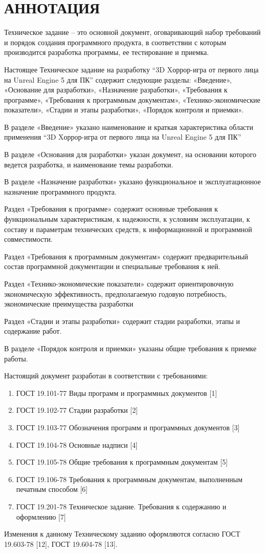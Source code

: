 \section*{АННОТАЦИЯ}

Техническое задание – это основной документ, оговаривающий набор требований и
порядок создания программного продукта, в соответствии с которым производится разработка программы, ее тестирование и приемка.

Настоящее Техническое задание на разработку ``3D Xоррор-игра от первого лица на Unreal Engine 5 для ПК'' содержит следующие разделы: «Введение», «Основание для разработки», «Назначение разработки», «Требования к программе», «Требования к программным документам», «Технико-экономические показатели», «Стадии и этапы разработки», «Порядок контроля и приемки».

В разделе «Введение» указано наименование и краткая характеристика области применения ``3D Xоррор-игра от первого лица на Unreal Engine 5 для ПК''

В разделе «Основания для разработки» указан документ, на основании которого ведется разработка, и наименование темы разработки.

В разделе «Назначение разработки» указано функциональное и эксплуатационное
назначение программного продукта.

Раздел «Требования к программе» содержит основные требования к функциональным характеристикам, к надежности, к условиям эксплуатации, к составу и параметрам технических средств, к информационной и программной совместимости.

Раздел «Требования к программным документам» содержит предварительный состав программной документации и специальные требования к ней.

Раздел «Технико-экономические показатели» содержит ориентировочную экономическую эффективность, предполагаемую годовую потребность, экономические преимущества разработки 

Раздел «Стадии и этапы разработки» содержит стадии разработки, этапы и содержание работ.

В разделе «Порядок контроля и приемки» указаны общие требования к приемке работы.

Настоящий документ разработан в соответствии с требованиями:
\begin{enumerate}
    \item ГОСТ 19.101-77 Виды программ и программных документов [1]
    \item ГОСТ 19.102-77 Стадии разработки [2]
    \item ГОСТ 19.103-77 Обозначения программ и программных документов [3]
    \item ГОСТ 19.104-78 Основные надписи [4]
    \item ГОСТ 19.105-78 Общие требования к программным документам [5]
    \item ГОСТ 19.106-78 Требования к программным документам, выполненным печатным способом [6]
    \item ГОСТ 19.201-78 Техническое задание. Требования к содержанию и оформлению [7]
\end{enumerate}

Изменения к данному Техническому заданию оформляются согласно ГОСТ 19.603-78 [12], ГОСТ 19.604-78 [13].
